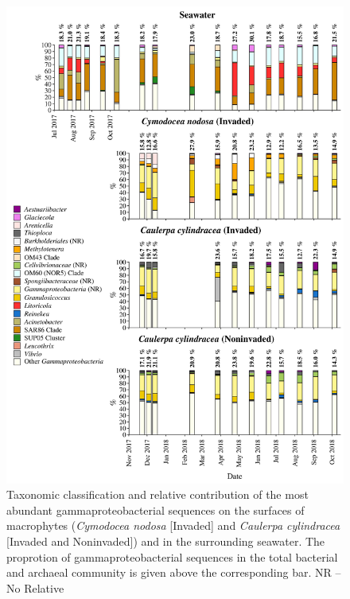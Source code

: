 \documentclass[12pt,]{article}
\begin{document}
\begin{figure}[H]

{\centering \includegraphics[width=0.85\linewidth]{../results/figures/gammaproteobacteria_bar_plot} 

}

\caption{Taxonomic classification and relative contribution of the most abundant gammaproteobacterial sequences on the surfaces of macrophytes (\textit{Cymodocea nodosa} [Invaded] and \textit{Caulerpa cylindracea} [Invaded and Noninvaded]) and in the surrounding seawater. The proprotion of gammaproteobacterial sequences in the total bacterial and archaeal community is given above the corresponding bar. NR -- No Relative\label{gamma}}\label{fig:unnamed-chunk-10}
\end{figure}
\end{document}
